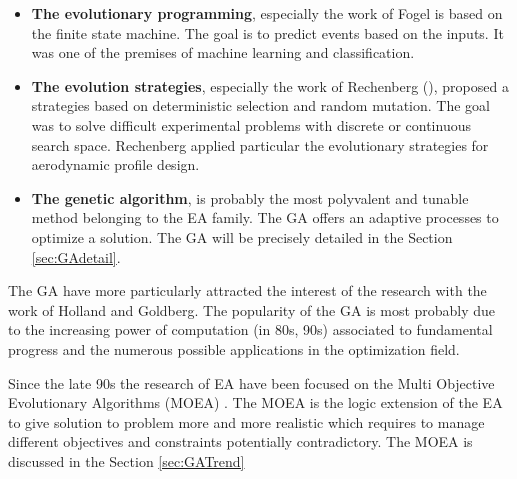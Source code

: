 \begin{itemize}
\item \textbf{The evolutionary programming}, especially the work of Fogel is based on the finite state machine. The goal is to predict events based on the inputs. It was one of the premises of machine learning and classification.\\ %

\item \textbf{The evolution strategies}, especially the work of  Rechenberg (\cite{rechenberg1965}), proposed a strategies based on deterministic selection and random mutation. The goal was to solve difficult experimental problems with discrete or continuous search space. Rechenberg applied particular the evolutionary strategies for aerodynamic profile design. \\ %

\item \textbf{The genetic algorithm}, is probably the most polyvalent and tunable method belonging  to the EA family. The GA offers an adaptive processes to optimize a solution. The GA will be precisely detailed in the Section \ref{sec:GAdetail}.\\  
\end{itemize}

The GA have more particularly attracted the interest of the research with the work of Holland and  Goldberg. The popularity of the GA is most probably due to the increasing power of computation (in 80s, 90s) associated to fundamental progress and the numerous possible applications in the optimization field.

Since the late 90s the research of EA have been focused on the Multi Objective Evolutionary Algorithms (MOEA)   \cite{75*zhou2011, 114*Zhang2007, 140*soremekun2001}. The MOEA is the logic extension of the EA to give solution to problem more and more realistic which requires to manage different objectives and constraints potentially contradictory. The MOEA is discussed in the Section \ref{sec:GATrend} %



 


